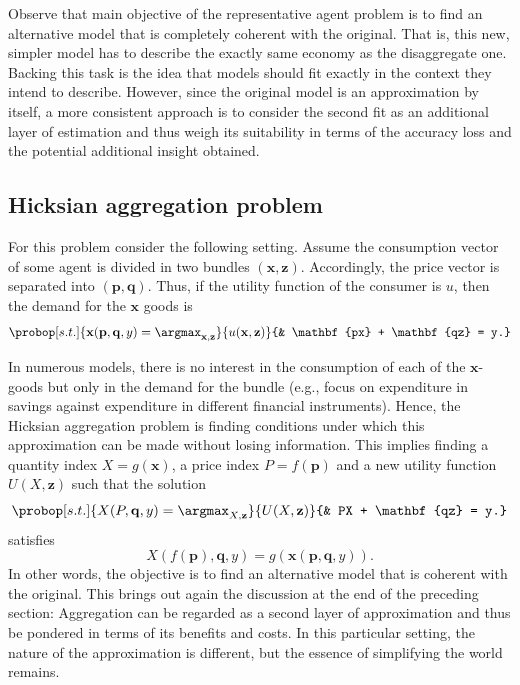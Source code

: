 \documentclass[english, a4paper, 12pt]{article}
\begin{document}
Observe that main objective of the representative agent problem is to find an alternative model that is completely coherent with the original. That is, this new, simpler model has to describe the exactly same economy as the disaggregate one. Backing this task is the idea that models should fit exactly in the context they intend to describe. However, since the original model is an approximation by itself, a more consistent approach is to consider the second fit as an additional layer of estimation and thus weigh its suitability in terms of the accuracy loss and the potential additional insight obtained.

\subsection{Hicksian aggregation problem} \label{ssec:HicksAgg}
For this problem consider the following setting. Assume the consumption vector of some agent is divided in two bundles $(\mathbf{x}, \mathbf{z})$. Accordingly, the price vector is separated into $(\mathbf{p}, \mathbf{q})$. Thus, if the utility function of the consumer is $u$, then the demand for the $\mathbf{x}$ goods is
	\begin{equation} \label{eq:hickdisprob}
		\probop[s.t.]{\mathbf{x}(\mathbf{p}, \mathbf{q}, y) = \argmax_{\mathbf{x}, \mathbf{z}}}{u(\mathbf{x}, \mathbf{z})}
					{&	\mathbf{px} + \mathbf{qz} = y.}
	\end{equation}

In numerous models, there is no interest in the consumption of each of the $\mathbf{x}$-goods but only in the demand for the bundle (e.g., focus on expenditure in savings against expenditure in different financial instruments). Hence, the Hicksian aggregation problem is finding conditions under which this approximation can be made without losing information. This implies finding a quantity index $X = g(\mathbf{x})$, a price index $P = f(\mathbf{p})$ and a new utility function $U(X, \mathbf{z})$ such that the solution
	 \begin{equation} \label{eq:hickaggprob}
		\probop[s.t.]{X(P, \mathbf{q}, y) = \argmax_{X, \mathbf{z}}}{U(X, \mathbf{z})}
					{&	PX + \mathbf{qz} = y.}
	\end{equation}
satisfies
	$$X(f(\mathbf{p}), \mathbf{q}, y) = g(\mathbf{x}(\mathbf{p}, \mathbf{q}, y)).$$
In other words, the objective is to find an alternative model that is coherent with the original. This brings out again the discussion at the end of the preceding section: Aggregation can be regarded as a second layer of approximation and thus be pondered in terms of its benefits and costs. In this particular setting, the nature of the approximation is different, but the essence of simplifying the world remains.
\end{document}
